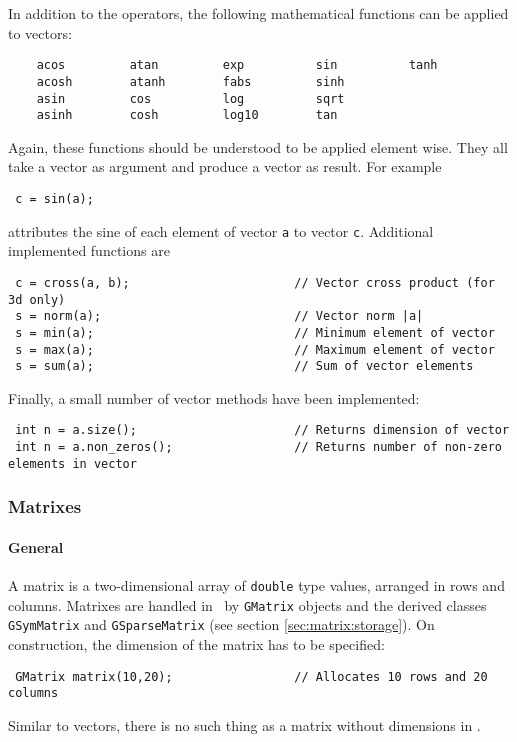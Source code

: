 \documentclass{article}[12pt,a4]
\begin{document}
In addition to the operators, the following mathematical functions 
can be applied to vectors:
\begin{verbatim}
    acos         atan         exp          sin          tanh
    acosh        atanh        fabs         sinh
    asin         cos          log          sqrt
    asinh        cosh         log10        tan
\end{verbatim}
Again, these functions should be understood to be applied element wise.
They all take a vector as argument and produce a vector as result.
For example
\begin{verbatim}
 c = sin(a);
\end{verbatim}
attributes the sine of each element of vector {\tt a} to vector 
{\tt c}.
Additional implemented functions are
\begin{verbatim}
 c = cross(a, b);                       // Vector cross product (for 3d only)
 s = norm(a);                           // Vector norm |a|
 s = min(a);                            // Minimum element of vector
 s = max(a);                            // Maximum element of vector
 s = sum(a);                            // Sum of vector elements
\end{verbatim}
Finally, a small number of vector methods have been implemented:
\begin{verbatim}
 int n = a.size();                      // Returns dimension of vector
 int n = a.non_zeros();                 // Returns number of non-zero elements in vector
\end{verbatim}


\subsubsection{Matrixes}

\paragraph{General}

A matrix is a two-dimensional array of {\tt double} type values, 
arranged in rows and columns.
Matrixes are handled in \this\ by {\tt GMatrix} objects and the 
derived classes {\tt GSymMatrix} and {\tt GSparseMatrix} (see section 
\ref{sec:matrix:storage}).
On construction, the dimension of the matrix has to be specified:
\begin{verbatim}
 GMatrix matrix(10,20);                 // Allocates 10 rows and 20 columns
\end{verbatim}
Similar to vectors, there is no such thing as a matrix without 
dimensions in \this.
\end{document}
